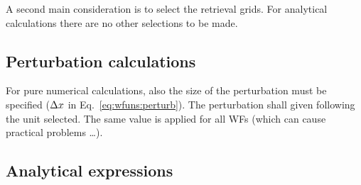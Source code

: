 A second main consideration is to select the retrieval grids. For analytical
calculations there are no other selections to be made. 


\subsection{Perturbation calculations}
%
For pure numerical calculations, also the size of the perturbation must be
specified ($\Delta x$ in Eq.~\ref{eq:wfuns:perturb}). The perturbation
shall given following the unit selected. The same value is applied for all WFs
(which can cause practical problems \dots).


\subsection{Analytical expressions}
%

